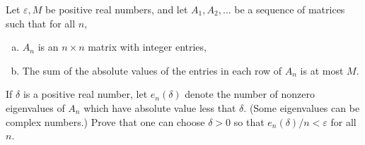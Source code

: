 Let $\varepsilon, M$ be positive real numbers, and let $A_1, A_2, \dots$ be a
sequence of matrices such that for all $n$,

\begin{enumerate}[(a)]
\item $A_n$ is an $n \times n$ matrix with integer entries,
\item The sum of the absolute values of the entries in each row of $A_n$ is at most $M$.
\end{enumerate}
If $\delta$ is a positive real number, let $e_n(\delta)$ denote the number of
nonzero eigenvalues of $A_n$ which have absolute value less that $\delta$.
(Some eigenvalues can be complex numbers.) Prove that one can choose $\delta >
0$ so that $e_n(\delta)/n < \varepsilon$ for all $n$.
